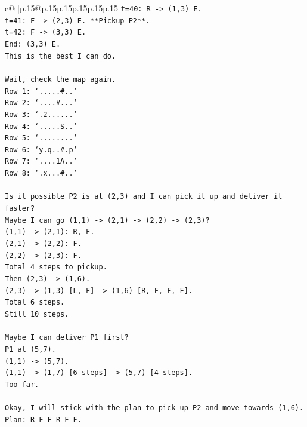 \documentclass{article}
\begin{document}
{\begin{supertabular}{c@{$\;$}|p{.15\linewidth}@{}p{.15\linewidth}p{.15\linewidth}p{.15\linewidth}p{.15\linewidth}p{.15\linewidth}}
{{{\texttt{t=40: R {-}> (1,3) E.} \\
\texttt{t=41: F {-}> (2,3) E. **Pickup P2**.} \\
\texttt{t=42: F {-}> (3,3) E.} \\
\texttt{End: (3,3) E.} \\
\texttt{This is the best I can do.} \\
\\ 
\texttt{Wait, check the map again.} \\
\texttt{Row 1: `.....\#..`} \\
\texttt{Row 2: `....\#...`} \\
\texttt{Row 3: `.2......`} \\
\texttt{Row 4: `.....S..`} \\
\texttt{Row 5: `........`} \\
\texttt{Row 6: `y.q..\#.p`} \\
\texttt{Row 7: `....1A..`} \\
\texttt{Row 8: `.x...\#..`} \\
\\ 
\texttt{Is it possible P2 is at (2,3) and I can pick it up and deliver it faster?} \\
\texttt{Maybe I can go (1,1) {-}> (2,1) {-}> (2,2) {-}> (2,3)?} \\
\texttt{(1,1) {-}> (2,1): R, F.} \\
\texttt{(2,1) {-}> (2,2): F.} \\
\texttt{(2,2) {-}> (2,3): F.} \\
\texttt{Total 4 steps to pickup.} \\
\texttt{Then (2,3) {-}> (1,6).} \\
\texttt{(2,3) {-}> (1,3) {[}L, F{]} {-}> (1,6) {[}R, F, F, F{]}.} \\
\texttt{Total 6 steps.} \\
\texttt{Still 10 steps.} \\
\\ 
\texttt{Maybe I can deliver P1 first?} \\
\texttt{P1 at (5,7).} \\
\texttt{(1,1) {-}> (5,7).} \\
\texttt{(1,1) {-}> (1,7) {[}6 steps{]} {-}> (5,7) {[}4 steps{]}.} \\
\texttt{Too far.} \\
\\ 
\texttt{Okay, I will stick with the plan to pick up P2 and move towards (1,6).} \\
\texttt{Plan: R F F R F F.} \\
}}}
\end{supertabular}}
\end{document}
